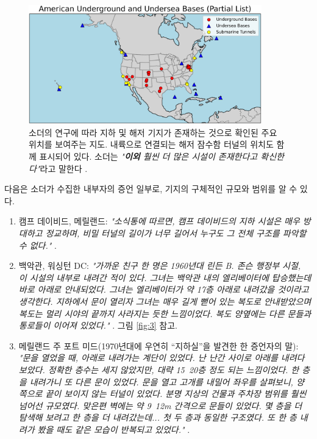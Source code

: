 \documentclass[10pt,twocolumn,letterpaper]{article}
\begin{document}
\begin{figure}[t]
\begin{center}
\includegraphics[width=0.9\textwidth]{basescrop.png}
\end{center}
   \caption{소더의 연구에 따라 지하 및 해저 기지가 존재하는 것으로 확인된 주요 위치를 보여주는 지도. 내륙으로 연결되는 해저 잠수함 터널의 위치도 함께 표시되어 있다. 소더는 \textit{"\textbf{이외} 훨씬 더 많은 시설이 존재한다고 확신한다"}라고 말한다 \cite{22}.}
   \label{fig:4}
\end{figure}

다음은 소더가 수집한 내부자의 증언 일부로, 기지의 구체적인 규모와 범위를 알 수 있다.

\begin{flushleft}
\begin{enumerate}
    \item 캠프 데이비드, 메릴랜드: \textit{"소식통에 따르면, 캠프 데이비드의 지하 시설은 매우 방대하고 정교하며, 비밀 터널의 길이가 너무 길어서 누구도 그 전체 구조를 파악할 수 없다."} \cite{22}.
    \item 백악관, 워싱턴 DC: \textit{"가까운 친구 한 명은 1960년대 린든 B. 존슨 행정부 시절, 이 시설의 내부로 내려간 적이 있다. 그녀는 백악관 내의 엘리베이터에 탑승했는데 바로 아래로 안내되었다. 그녀는 엘리베이터가 약 17층 아래로 내려갔을 것이라고 생각한다. 지하에서 문이 열리자 그녀는 매우 길게 뻗어 있는 복도로 안내받았으며 복도는 멀리 시야의 끝까지 사라지는 듯한 느낌이었다. 복도 양옆에는 다른 문들과 통로들이 이어져 있었다."} \cite{22}. 그림 \ref{fig:3} 참고.
    \item 메릴랜드 주 포트 미드(1970년대에 우연히 “지하실”을 발견한 한 증언자의 말): \textit{"문을 열었을 때, 아래로 내려가는 계단이 있었다. 난 난간 사이로 아래를 내려다보았다. 정확한 층수는 세지 않았지만, 대략 15~20층 정도 되는 느낌이었다. 한 층을 내려가니 또 다른 문이 있었다. 문을 열고 고개를 내밀어 좌우를 살펴보니, 양쪽으로 끝이 보이지 않는 터널이 있었다. 분명 지상의 건물과 주차장 범위를 훨씬 넘어선 규모였다. 맞은편 벽에는 약 9~12m 간격으로 문들이 있었다. 몇 층을 더 탐색해 보려고 한 층을 더 내려갔는데... 첫 두 층과 동일한 구조였다. 또 한 층 내려가 봤을 때도 같은 모습이 반복되고 있었다."} \cite{22}.
\end{enumerate}
\end{flushleft}
\end{document}
